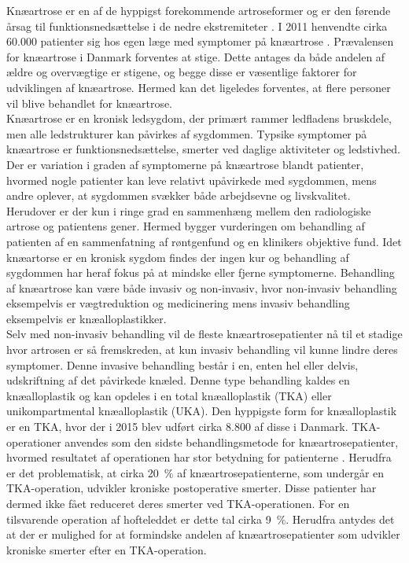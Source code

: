 Knæartrose er en af de hyppigst forekommende artroseformer og er den førende årsag til funktionsnedsættelse i de nedre ekstremiteter \citep{Beswick2012}. I 2011 henvendte cirka 60.000 patienter sig hos egen læge med symptomer på knæartrose \citep{brostrom2012}. Prævalensen for knæartrose i Danmark forventes at stige. Dette antages da både andelen af ældre og overvægtige er stigene, og begge disse er væsentlige faktorer for udviklingen af knæartrose. \citep{sygdom} Hermed kan det ligeledes forventes, at flere personer vil blive behandlet for knæartrose. \\    
Knæartrose er en kronisk ledsygdom, der primært rammer ledfladens bruskdele, men alle ledstrukturer kan påvirkes af sygdommen. \citep{schroder} Typsike symptomer på knæartrose er funktionsnedsættelse, smerter ved daglige aktiviteter og ledstivhed. Der er variation i graden af symptomerne på knæartrose blandt patienter, hvormed nogle patienter kan leve relativt upåvirkede med sygdommen, mens andre oplever, at sygdommen svækker både arbejdsevne og livskvalitet. \citep{sygdom} Herudover er der kun i ringe grad en sammenhæng mellem den radiologiske artrose og patientens gener. Hermed bygger vurderingen om behandling af patienten af en sammenfatning af røntgenfund og en klinikers objektive fund. \citep{ugeskrift2011} Idet knæartorse er en kronisk sygdom findes der ingen kur og behandling af sygdommen har heraf fokus på at mindske eller fjerne symptomerne. Behandling af knæartrose kan være både invasiv og non-invasiv, hvor non-invasiv behandling eksempelvis er vægtreduktion og medicinering mens invasiv behandling eksempelvis er knæalloplastikker. \\
Selv med non-invasiv behandling vil de fleste knæartrosepatienter nå til et stadige hvor artrosen er så fremskreden, at kun invasiv behandling vil kunne lindre deres symptomer. \citep{brostrom2012} Denne invasive behandling består i en, enten hel eller delvis, udskriftning af det påvirkede knæled. Denne type behandling kaldes en knæalloplastik og kan opdeles i en total knæalloplastik (TKA) eller unikompartmental knæalloplastik (UKA). Den hyppigste form for knæalloplastik er en TKA, hvor der i 2015 blev udført cirka 8.800 af disse i Danmark. \citep{aarsrapport2016} TKA-operationer anvendes som den sidste behandlingsmetode for knæartrosepatienter, hvormed resultatet af operationen har stor betydning for patienterne \citep{brostrom2012}. Herudfra er det problematisk, at cirka 20~\% af knæartrosepatienterne, som undergår en TKA-operation, udvikler kroniske postoperative smerter. Disse patienter har dermed ikke fået reduceret deres smerter ved TKA-operationen. For en tilsvarende operation af hofteleddet er dette tal cirka 9~\%. \citep{Beswick2012} Herudfra antydes det at der er mulighed for at formindske andelen af knæartrosepatienter som udvikler kroniske smerter efter en TKA-operation.     

